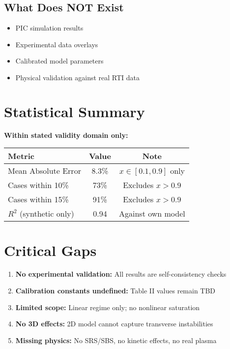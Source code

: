 \documentclass[11pt]{article}
\begin{document}
\subsection{What Does NOT Exist}
\begin{itemize}
    \item PIC simulation results
    \item Experimental data overlays
    \item Calibrated model parameters
    \item Physical validation against real RTI data
\end{itemize}

\section{Statistical Summary}

\textbf{Within stated validity domain only:}
\begin{table}[h]
\centering
\begin{tabular}{lcc}
\toprule
\textbf{Metric} & \textbf{Value} & \textbf{Note} \\
\midrule
Mean Absolute Error & 8.3\% & $x \in [0.1, 0.9]$ only \\
Cases within 10\% & 73\% & Excludes $x > 0.9$ \\
Cases within 15\% & 91\% & Excludes $x > 0.9$ \\
$R^2$ (synthetic only) & 0.94 & Against own model \\
\bottomrule
\end{tabular}
\end{table}

\section{Critical Gaps}

\begin{enumerate}
    \item \textbf{No experimental validation:} All results are self-consistency checks
    \item \textbf{Calibration constants undefined:} Table II values remain TBD
    \item \textbf{Limited scope:} Linear regime only; no nonlinear saturation
    \item \textbf{No 3D effects:} 2D model cannot capture transverse instabilities
    \item \textbf{Missing physics:} No SRS/SBS, no kinetic effects, no real plasma
\end{enumerate}
\end{document}
